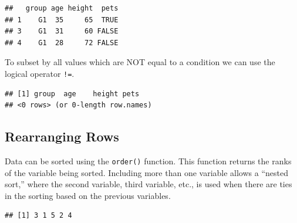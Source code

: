 \documentclass[
]{book}
\newenvironment{Shaded}{\begin{snugshade}}{\end{snugshade}}
\newcommand{\KeywordTok}[1]{\textcolor[rgb]{0.13,0.29,0.53}{\textbf{#1}}}
\newcommand{\NormalTok}[1]{#1}
\newcommand{\OperatorTok}[1]{\textcolor[rgb]{0.81,0.36,0.00}{\textbf{#1}}}
\newcommand{\StringTok}[1]{\textcolor[rgb]{0.31,0.60,0.02}{#1}}
\begin{document}
\begin{verbatim}
##   group age height  pets
## 1    G1  35     65  TRUE
## 3    G1  31     60 FALSE
## 4    G1  28     72 FALSE
\end{verbatim}

To subset by all values which are NOT equal to a condition we can use the logical operator \texttt{!=}.

\begin{Shaded}
\end{Shaded}

\begin{verbatim}
## [1] group  age    height pets  
## <0 rows> (or 0-length row.names)
\end{verbatim}

\hypertarget{rearranging-rows}{%
\subsection*{Rearranging Rows}\label{rearranging-rows}}

Data can be sorted using the \texttt{order()} function. This function returns the ranks of the variable being sorted. Including more than one variable allows a ``nested sort,'' where the second variable, third variable, etc., is used when there are ties in the sorting based on the previous variables.

\begin{Shaded}
\end{Shaded}

\begin{verbatim}
## [1] 3 1 5 2 4
\end{verbatim}

\begin{Shaded}
\end{Shaded}
\end{document}
